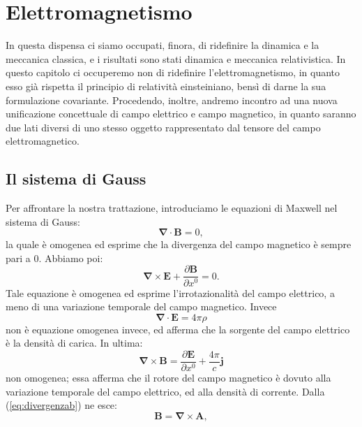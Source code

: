 \chapter{Elettromagnetismo}
\minitoc In questa dispensa ci siamo occupati, finora, di ridefinire
la dinamica e la meccanica classica, e i risultati sono stati dinamica
e meccanica relativistica. In questo capitolo ci occuperemo non di
ridefinire l'elettromagnetismo, in quanto esso gi\`a rispetta il
principio di relativit\`a einsteiniano, bens\`i di darne la sua
formulazione covariante.  Procedendo, inoltre, andremo incontro ad una
nuova unificazione concettuale di campo elettrico e campo magnetico,
in quanto saranno due lati diversi di uno stesso oggetto rappresentato
dal tensore del campo elettromagnetico.

\section{Il sistema di Gauss}
Per affrontare la nostra trattazione, introduciamo le equazioni di
Maxwell nel sistema di Gauss:
\begin{equation}
  \mathbf{\nabla \cdot B } = 0, \label{eq:divergenzab}
\end{equation}
la quale \`e omogenea ed esprime che la divergenza del campo magnetico
\`e sempre pari a 0. Abbiamo poi:
\begin{equation}
  \mathbf{\nabla \times E } + \frac{ \partial \mathbf{B}}{ \partial
    x^0 } = 0. \label{eq:rotoree}
\end{equation}
Tale equazione \`e omogenea ed esprime l'irrotazionalit\`a del campo
elettrico, a meno di una variazione temporale del campo
magnetico. Invece
\begin{equation}
  \mathbf{\nabla \cdot E }  = 4 \pi \rho \label{eq:divergenzae}
\end{equation}
non \`e equazione omogenea invece, ed afferma che la sorgente del
campo elettrico \`e la densit\`a di carica. In ultima:
\begin{equation}
  \mathbf{\nabla \times B } = \frac{ \partial \mathbf{E}}{ \partial
    x^0 } + \frac{ 4 \pi }{c} \mathbf{ j } \label{eq:rotoreb}
\end{equation}
non omogenea; essa afferma che il rotore del campo magnetico \`e
dovuto alla variazione temporale del campo elettrico, ed alla
densit\`a di corrente.  \newline Dalla (\ref{eq:divergenzab}) ne esce:
\begin{equation}
  \mathbf{B} = \mathbf{\nabla \times A}, \label{eq:rotorea}
\end{equation}
